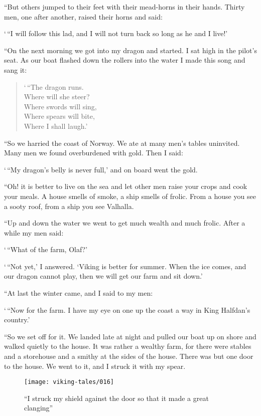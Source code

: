 ``But others jumped to their feet with their mead-horns in their hands.
Thirty men, one after another, raised their horns and said:

`\,``I will follow this lad, and I will not turn back so long as he and I
live!'

``On the next morning we got into my dragon and started. I sat high in
the pilot's seat. As our boat flashed down the rollers into the water I
made this song and sang it:

\begin{quote}
`\,``The dragon runs.\\
Where will she steer?\\
Where swords will sing,\\
Where spears will bite,\\
Where I shall laugh.'
\end{quote}

``So we harried the coast of Norway. We ate at many men's tables
uninvited. Many men we found overburdened with gold. Then I said:

`\,``My dragon's belly is never full,' and on board went the gold.

``Oh! it is better to live on the sea and let other men raise your crops
and cook your meals. A house smells of smoke, a ship smells of frolic.
From a house you see a sooty roof, from a ship you see Valhalla.

``Up and down the water we went to get much wealth and much frolic. After
a while my men said:

`\,``What of the farm, Olaf?'

`\,``Not yet,' I answered. `Viking is better for summer. When the ice
comes, and our dragon cannot play, then we will get our farm and sit
down.'

``At last the winter came, and I said to my men:

`\,``Now for the farm. I have my eye on one up the coast a way in King
Halfdan's country.'

``So we set off for it. We landed late at night and pulled our boat up on
shore and walked quietly to the house. It was rather a wealthy farm, for
there were stables and a storehouse and a smithy at the sides of the
house. There was but one door to the house. We went to it, and I struck
it with my spear.

\begin{figure}
    \centering
    \texttt{[image: viking-tales/016]}
    \caption{
        ``I struck my shield against the door so that it made a great
        clanging''}
\end{figure}


